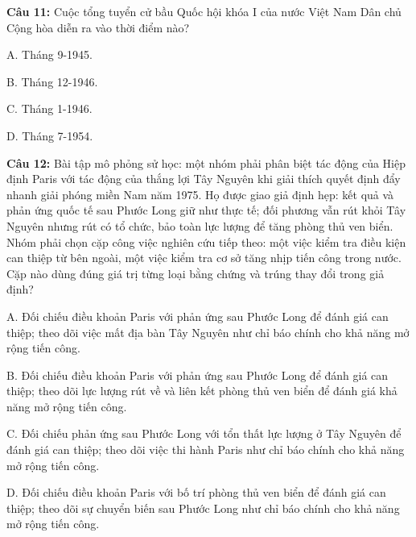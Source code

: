 \documentclass[12pt,a4paper]{article}
\begin{document}
\par\noindent\begin{minipage}{\linewidth}
\noindent\textbf{Câu 11:} Cuộc tổng tuyển cử bầu Quốc hội khóa I của nước Việt Nam Dân chủ Cộng hòa diễn ra vào thời điểm nào?\par
\noindent A. Tháng 9-1945.\par
\noindent B. Tháng 12-1946.\par
\noindent C. Tháng 1-1946.\par
\noindent D. Tháng 7-1954.\par
\end{minipage}\par\vspace{0.12cm}

\par\noindent\begin{minipage}{\linewidth}
\noindent\textbf{Câu 12:} Bài tập mô phỏng sử học: một nhóm phải phân biệt tác động của Hiệp định Paris với tác động của thắng lợi Tây Nguyên khi giải thích quyết định đẩy nhanh giải phóng miền Nam năm 1975. Họ được giao giả định hẹp: kết quả và phản ứng quốc tế sau Phước Long giữ như thực tế; đối phương vẫn rút khỏi Tây Nguyên nhưng rút có tổ chức, bảo toàn lực lượng để tăng phòng thủ ven biển. Nhóm phải chọn cặp công việc nghiên cứu tiếp theo: một việc kiểm tra điều kiện can thiệp từ bên ngoài, một việc kiểm tra cơ sở tăng nhịp tiến công trong nước. Cặp nào dùng đúng giá trị từng loại bằng chứng và trúng thay đổi trong giả định?\par
\noindent A. Đối chiếu điều khoản Paris với phản ứng sau Phước Long để đánh giá can thiệp; theo dõi việc mất địa bàn Tây Nguyên như chỉ báo chính cho khả năng mở rộng tiến công.\par
\noindent B. Đối chiếu điều khoản Paris với phản ứng sau Phước Long để đánh giá can thiệp; theo dõi lực lượng rút về và liên kết phòng thủ ven biển để đánh giá khả năng mở rộng tiến công.\par
\noindent C. Đối chiếu phản ứng sau Phước Long với tổn thất lực lượng ở Tây Nguyên để đánh giá can thiệp; theo dõi việc thi hành Paris như chỉ báo chính cho khả năng mở rộng tiến công.\par
\noindent D. Đối chiếu điều khoản Paris với bố trí phòng thủ ven biển để đánh giá can thiệp; theo dõi sự chuyển biến sau Phước Long như chỉ báo chính cho khả năng mở rộng tiến công.\par
\end{minipage}\par\vspace{0.12cm}
\end{document}
